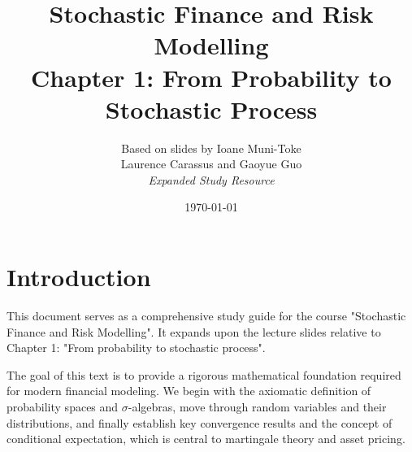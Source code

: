 \documentclass[12pt, a4paper]{report}
\title{\textbf{Stochastic Finance and Risk Modelling} \\ \large Chapter 1: From Probability to Stochastic Process}
\author{Based on slides by Ioane Muni-Toke \\ Laurence Carassus and Gaoyue Guo \\ \textit{Expanded Study Resource}}
\date{\today}
\theoremstyle{definition}
\begin{document}
\maketitle

\tableofcontents

\chapter*{Introduction}
This document serves as a comprehensive study guide for the course "Stochastic Finance and Risk Modelling". It expands upon the lecture slides relative to Chapter 1: "From probability to stochastic process". 

The goal of this text is to provide a rigorous mathematical foundation required for modern financial modeling. We begin with the axiomatic definition of probability spaces and $\sigma$-algebras, move through random variables and their distributions, and finally establish key convergence results and the concept of conditional expectation, which is central to martingale theory and asset pricing.







\end{document}
